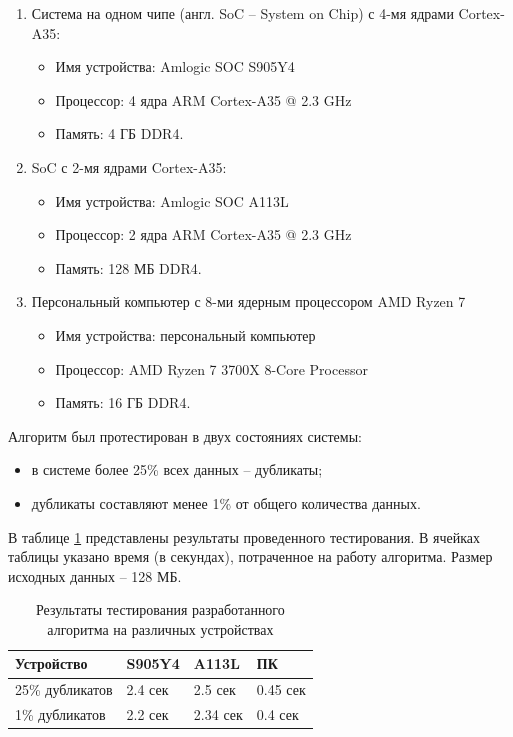 \documentclass[12pt, a4paper]{article}
\begin{document}
\begin{enumerate}
	\item Система на одном чипе (англ. SoC -- System on Chip) с 4-мя ядрами Cortex-A35:
	
	\begin{itemize}
		\item Имя устройства: Amlogic SOC S905Y4
		\item Процессор: 4 ядра ARM Cortex-A35 @ 2.3 GHz
		\item Память: 4 ГБ DDR4.
	\end{itemize}
	
	\item SoC с 2-мя ядрами Cortex-A35:
	
	\begin{itemize}
		\item Имя устройства: Amlogic SOC A113L
		\item Процессор: 2 ядра ARM Cortex-A35 @ 2.3 GHz
		\item Память: 128 МБ DDR4.
	\end{itemize}
	
	\item Персональный компьютер с 8-ми ядерным процессором AMD Ryzen 7
	
	\begin{itemize}
		\item Имя устройства: персональный компьютер
		\item Процессор: AMD Ryzen 7 3700X 8-Core Processor
		\item Память: 16 ГБ DDR4.
	\end{itemize}
\end{enumerate}

Алгоритм был протестирован в двух состояниях системы:

\begin{itemize}
	\item в системе более 25\% всех данных -- дубликаты;
	\item дубликаты составляют менее 1\% от общего количества данных.
\end{itemize}

В таблице \ref{tbl:results} представлены результаты проведенного тестирования. В ячейках таблицы указано время (в секундах), потраченное на работу алгоритма. Размер исходных данных -- 128 МБ.

\begin{table}[ht]
	\small
	\caption{Результаты тестирования разработанного алгоритма на различных устройствах}
	\label{tbl:results}
	\begin{tabular}{|l|l|l|l|}
		\hline
		Устройство & S905Y4 & A113L & ПК \\ \hline
		25\% дубликатов & 2.4 сек & 2.5 сек & 0.45 сек \\ \hline
		1\% дубликатов & 2.2 сек & 2.34 сек & 0.4 сек \\ \hline
	\end{tabular}
\end{table}
\end{document}
